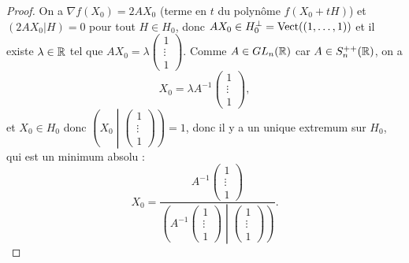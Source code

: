 \documentclass[12pt]{article}
\begin{document}
\begin{proof}
	On a $\nabla f(X_0)=2AX_0$ (terme en $t$ du polynôme $f(X_0+tH)$) et $(2AX_{0}|H)=0$ pour tout $H\in H_0$, donc $AX_0\in H_0^{\perp}=\operatorname{Vect}((1,\dots,1))$ et il existe $\lambda\in\mathbb{R}$ tel que $AX_{0}=\lambda\begin{pmatrix}
		1\\\vdots\\1
	\end{pmatrix}$. Comme $A\in GL_{n}(\mathbb{R})$ car $A\in S_{n}^{++}(\mathbb{R})$, on a 
	\begin{equation}
		X_0=\lambda A^{-1}\begin{pmatrix}
			1\\\vdots\\1
		\end{pmatrix},
	\end{equation}
	et $X_0\in H_0$ donc $\left(X_0\middle|\begin{pmatrix}
		1\\\vdots\\1
	\end{pmatrix}\right)=1$, donc il y a un unique extremum sur $H_0$, qui est un minimum absolu : 
	\begin{equation}
		X_0=\frac{
			A^{-1}\begin{pmatrix}
				1\\\vdots\\1
			\end{pmatrix}
		}{
			\left(
				A^{-1}\begin{pmatrix}
					1\\\vdots\\1
				\end{pmatrix}\middle|
				\begin{pmatrix}
					1\\\vdots\\1
				\end{pmatrix}
			\right)
		}.
	\end{equation}
\end{proof}
\end{document}
